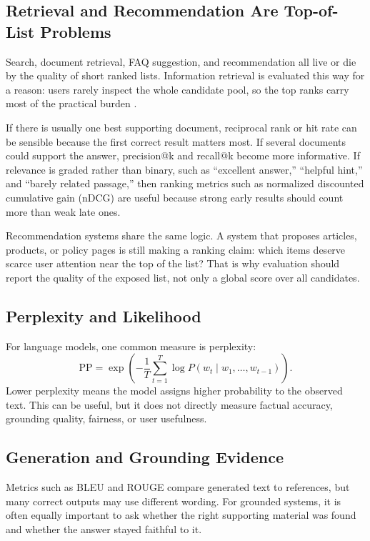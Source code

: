 \subsection{Retrieval and Recommendation Are Top-of-List Problems}

Search, document retrieval, FAQ suggestion, and recommendation all live or die by the quality of short ranked lists. Information retrieval is evaluated this way for a reason: users rarely inspect the whole candidate pool, so the top ranks carry most of the practical burden \citep{manning2008}.

If there is usually one best supporting document, reciprocal rank or hit rate can be sensible because the first correct result matters most. If several documents could support the answer, precision@k and recall@k become more informative. If relevance is graded rather than binary, such as ``excellent answer,'' ``helpful hint,'' and ``barely related passage,'' then ranking metrics such as normalized discounted cumulative gain (nDCG) are useful because strong early results should count more than weak late ones.

Recommendation systems share the same logic. A system that proposes articles, products, or policy pages is still making a ranking claim: which items deserve scarce user attention near the top of the list? That is why evaluation should report the quality of the exposed list, not only a global score over all candidates.

\subsection{Perplexity and Likelihood}

For language models, one common measure is perplexity:
\[
\mathrm{PP} = \exp\left(-\frac{1}{T}\sum_{t=1}^{T}\log P(w_t \mid w_1,\ldots,w_{t-1})\right).
\]
Lower perplexity means the model assigns higher probability to the observed text. This can be useful, but it does not directly measure factual accuracy, grounding quality, fairness, or user usefulness.

\subsection{Generation and Grounding Evidence}

Metrics such as BLEU and ROUGE compare generated text to references, but many correct outputs may use different wording. For grounded systems, it is often equally important to ask whether the right supporting material was found and whether the answer stayed faithful to it.

